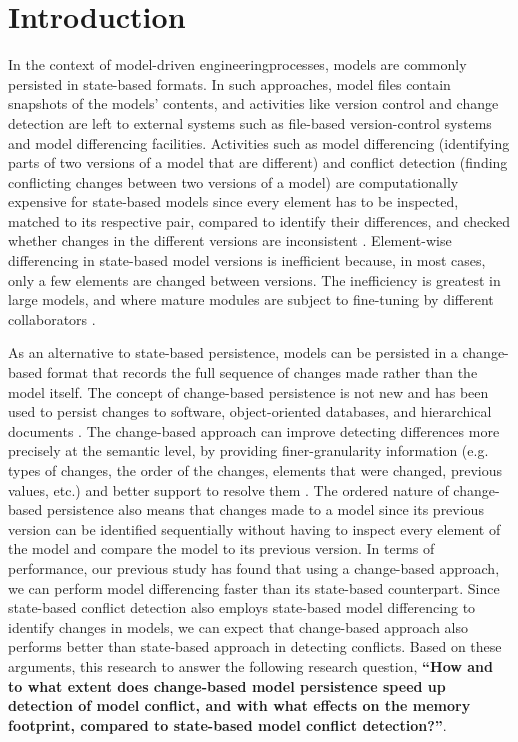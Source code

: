 \section{Introduction}
\label{sec:introduction}

In the context of model-driven engineeringprocesses, models are commonly persisted in state-based formats. In such approaches, model files contain snapshots of the models' contents, and activities like version control and change detection are left to external systems such as file-based version-control systems and model differencing facilities. Activities such as model differencing (identifying parts of two versions of a model that are different) and conflict detection (finding conflicting changes between two versions of a model) are computationally expensive for state-based models \cite{Kolovos:2009:DMM:1564596.1564641} since every element has to be inspected, matched to its respective pair, compared to identify their differences, and checked whether changes in the different versions are inconsistent \cite{emfcompare2018developer}. Element-wise differencing in state-based model versions is inefficient because, in most cases, only a few elements are changed between versions. The inefficiency is greatest in large models, and where mature modules are subject to fine-tuning by different collaborators \cite{selic2003pragmatics}. 

As an alternative to state-based persistence, models can be persisted in a change-based format that records the full sequence of changes made rather than the model itself. The concept of change-based persistence is not new and has been used to persist changes to software, object-oriented databases, and hierarchical documents \cite{DBLP:journals/entcs/RobbesL07,DBLP:conf/sde/LippeO92,DBLP:conf/caise/IgnatN05}. The change-based approach can improve detecting differences more precisely at the semantic level, by providing finer-granularity information (e.g. types of changes, the order of the changes, 
elements that were changed, previous values, etc.) and better support to resolve them \cite{mens2002state}. The ordered nature of change-based persistence also means that changes made to a model since its previous version can be identified sequentially without having to inspect every element of the model and compare the model to its previous version. 
In terms of performance, our previous study \cite{yohannis2019efficient} has found that using a change-based approach, we can perform model differencing faster than its state-based counterpart. Since state-based conflict detection also employs state-based model differencing to identify changes in models, we can expect that change-based approach also performs better than state-based approach in detecting conflicts. Based on these arguments, this research to answer the following research question, \textbf{``How and to what extent does change-based model persistence speed up detection of model conflict, and with what effects on the memory footprint, compared to state-based model conflict detection?''}. 

